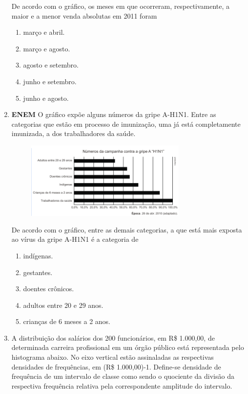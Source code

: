 \documentclass[twocolumn,oneside,a4paper,10pt]{article}
\begin{document}
\begin{enumerate}
De acordo com o gráfico, os meses em que ocorreram, respectivamente, a maior e a menor venda absolutas em 2011 foram

\begin{enumerate}
\item março e abril.
\item março e agosto.
\item agosto e setembro.
\item junho e setembro.
\item junho e agosto.
\end{enumerate}

\newpage
\item \textbf{ENEM} O gráfico expõe alguns números da gripe A-H1N1. Entre as categorias que estão em processo de imunização, uma já está completamente imunizada, a dos trabalhadores da saúde.

\begin{figure}[!htb]
\center
\includegraphics[width=8cm]{Figuras/g12.png}
\end{figure}

De acordo com o gráfico, entre as demais categorias, a que está mais exposta ao vírus da gripe A-H1N1 é a categoria de

\begin{enumerate}
\item indígenas.
\item gestantes.
\item doentes crônicos.
\item adultos entre 20 e 29 anos.
\item crianças de 6 meses a 2 anos.
\end{enumerate}

\item A distribuição dos salários dos 200 funcionários, em R\$ 1.000,00, de determinada carreira profissional em um órgão público está representada pelo histograma abaixo. No eixo vertical estão assinaladas as respectivas densidades de frequências, em (R\$ 1.000,00)-1. Define-se densidade de frequência de um intervalo de classe como sendo o quociente da divisão da respectiva frequência relativa pela correspondente amplitude do intervalo.


\end{enumerate}
\end{document}
